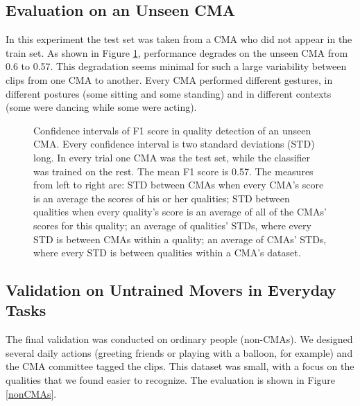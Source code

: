 \documentclass{sigchi}
\begin{document}
\subsection{Evaluation on an Unseen CMA}
In this experiment the test set was taken from a CMA who did not appear in the train set.
As shown in Figure \ref{domainAdaptationBaseLine}, performance degrades on the unseen CMA from 0.6 to 0.57.
This degradation seems minimal for such a large variability between clips from one CMA to another. Every CMA performed different gestures, in different postures (some sitting and some standing) 
and in different contexts (some were dancing while some were acting).

\begin{figure}[!h]
\centering
{}
\caption{Confidence intervals of F1 score in quality detection of an unseen CMA.
Every confidence interval is two standard deviations (STD) long.
In every trial one CMA was the test set, while the classifier was trained on the rest. The mean F1 score is 0.57. The measures from left to right are: STD between CMAs when every CMA's score is an average the scores of his or her qualities; STD between qualities when every quality's score is an average of all of the CMAs' scores for this quality; an average of qualities' STDs, where every STD is between CMAs within a quality; an average of CMAs' STDs, where every STD is between qualities within a CMA's dataset.}
\label{domainAdaptationBaseLine}
\end{figure}

\subsection{Validation on Untrained Movers in Everyday Tasks}
The final validation was conducted on ordinary people (non-CMAs). We
designed several daily actions (greeting friends or playing with a balloon, for
example) and the CMA committee tagged the clips. This dataset was small, with a
focus on the qualities that we found easier to recognize. The evaluation is shown in Figure \ref{nonCMAs}.
\end{document}
